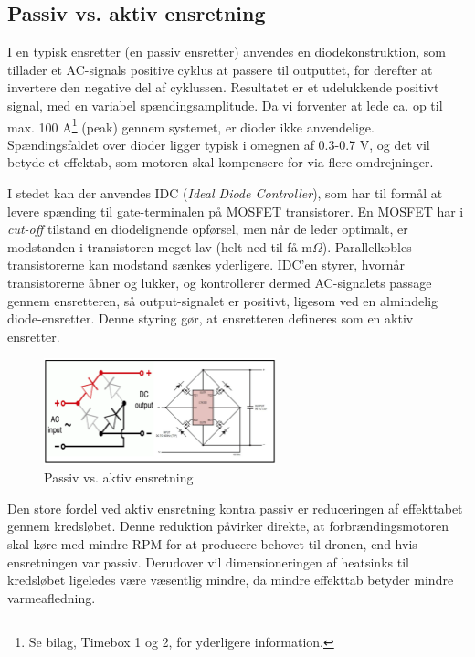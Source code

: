 \subsection{Passiv vs. aktiv ensretning}
\label{sec:passiv-vs.-aktiv}

I en typisk ensretter (en passiv ensretter) anvendes en diodekonstruktion, som tillader et AC-signals positive cyklus at passere til outputtet, for derefter at invertere den negative del af cyklussen. Resultatet er et udelukkende positivt signal, med en variabel spændingsamplitude. Da vi forventer at lede ca. op til max. 100 A\footnote{Se bilag, Timebox 1 og 2, for yderligere information.} (peak) gennem systemet, er dioder ikke anvendelige. Spændingsfaldet over dioder ligger typisk i omegnen af 0.3-0.7 V, og det vil betyde et effektab, som motoren skal kompensere for via flere omdrejninger.

I stedet kan der anvendes IDC (\textit{Ideal Diode Controller}), som har til formål at levere spænding til gate-terminalen på MOSFET transistorer. En MOSFET har i \textit{cut-off} tilstand en diodelignende opførsel, men når de leder optimalt, er modstanden i transistoren meget lav (helt ned til få m$\Omega$). Parallelkobles transistorerne kan modstand sænkes yderligere. IDC’en styrer, hvornår transistorerne åbner og lukker, og kontrollerer dermed AC-signalets passage gennem ensretteren, så output-signalet er positivt, ligesom ved en almindelig diode-ensretter. Denne styring gør, at ensretteren defineres som en aktiv ensretter.
\clearpage
\begin{figure}[h]
  \centering
  \includegraphics[width=0.6\textwidth]{./figurer/prens1.png}
  \caption{Passiv vs. aktiv ensretning}
  \label{fig:prens1}
\end{figure}

Den store fordel ved aktiv ensretning kontra passiv er reduceringen af effekttabet gennem kredsløbet. Denne reduktion påvirker direkte, at forbrændingsmotoren skal køre med mindre RPM for at producere behovet til dronen, end hvis ensretningen var passiv. Derudover vil dimensioneringen af heatsinks til kredsløbet ligeledes være væsentlig mindre, da mindre effekttab betyder mindre varmeafledning.  
  

